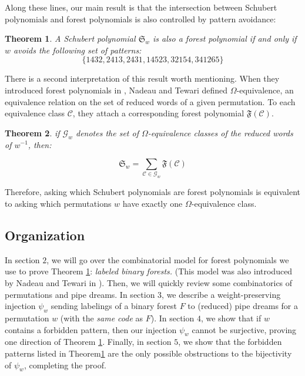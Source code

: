 \documentclass{article}
\newtheorem{theorem}{Theorem}[section]
\theoremstyle{definition} %
\begin{document}
Along these lines, our main result  is that the intersection between Schubert polynomials and forest polynomials is also controlled by pattern avoidance: 
\vspace{1em}

\begin{theorem}\label{thm:patternavoidance}
    A Schubert polynomial $\mathfrak{S}_w$ is also a forest polynomial if and only if $w$ avoids the following set of patterns: 
    \[\{1432, 2413, 2431, 14523, 32154, 341265\}\]
\end{theorem}

There is a second interpretation of this result worth mentioning. When they introduced forest polynomials in \cite{forestpolynomials1}, Nadeau and Tewari defined $\Omega$-equivalence, an equivalence relation on the set of reduced words of a given permutation. To each equivalence class $\mathcal{C}$, they attach a corresponding forest polynomial $\mathfrak{F}(\mathcal{C})$.
\vspace{1em}

\begin{theorem}
    if $\mathcal{G}_w$ denotes the set of $\Omega$-equivalence classes of the reduced words of $w^{-1}$, then:

\[\mathfrak{S}_w = \sum_{\mathcal{C} \in \mathcal{G}_w} \mathfrak{F}(\mathcal{C})\]

\end{theorem}

Therefore, asking which Schubert polynomials are  forest polynomials is equivalent to asking which permutations $w$ have exactly one $\Omega$-equivalence class. 

\subsection{Organization}
 In section $2$, we will go over the combinatorial model for forest polynomials we use to prove Theorem \ref{thm:patternavoidance}: \textit{labeled binary forests.} (This model was also introduced by Nadeau and Tewari in \cite{forestpolynomials1}). Then, we will quickly review some combinatorics of permutations and pipe dreams. In section $3$, we describe a weight-preserving injection $\psi_w$ sending labelings of a binary forest $F$ to (reduced) pipe dreams for a permutation $w$ (with the \textit{same code} as $F$). In section $4$, we show that if $w$ contains a forbidden pattern, then our injection $\psi_w$ cannot be surjective, proving one direction of Theorem \ref{thm:patternavoidance}. Finally, in section $5$, we show that the forbidden patterns listed in Theorem\ref{thm:patternavoidance} are the only possible obstructions to the bijectivity of $\psi_w$, completing the proof. 
\end{document}
